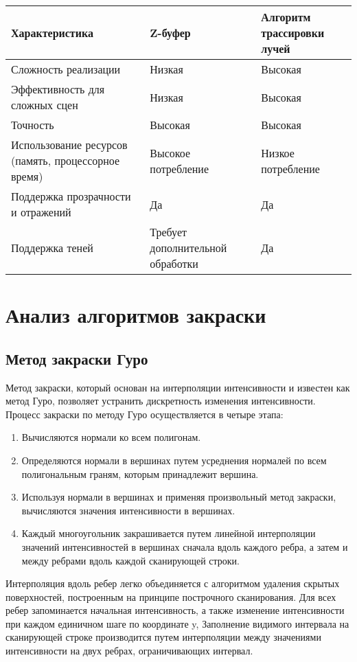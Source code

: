 	\begin{tabular}{|p{5cm}|p{5cm}|p{5cm}|}
		\hline
		Характеристика & Z-буфер & Алгоритм трассировки лучей \\
		\hline
		Сложность реализации & Низкая & Высокая \\
		\hline
		Эффективность для сложных сцен & Низкая & Высокая \\
		\hline
		Точность & Высокая & Высокая \\
		\hline
		Использование ресурсов (память, процессорное время) & Высокое потребление & Низкое потребление \\
		\hline
		Поддержка прозрачности и отражений & Да & Да \\
		\hline
		Поддержка теней & Требует дополнительной обработки & Да \\
		\hline
	\end{tabular}
\section{Анализ алгоритмов закраски}
	\subsection{Метод закраски Гуро}
	Метод закраски, который основан на интерполяции интенсивности и известен как метод Гуро, позволяет устранить дискретность изменения интенсивности. Процесс закраски по методу Гуро осуществляется в четыре этапа:
	\begin{enumerate}
	\item Вычисляются нормали ко всем полигонам.
	\item Определяются нормали в вершинах путем усреднения нормалей по всем полигональным граням, которым принадлежит вершина.
	
		
	\item Используя нормали в вершинах и применяя произвольный метод закраски, вычисляются значения интенсивности в вершинах.
	\item Каждый многоугольник закрашивается путем линейной интерполяции значений интенсивностей в вершинах сначала вдоль каждого ребра, а затем и между ребрами вдоль каждой сканирующей строки.
	
	
	\end{enumerate}
	Интерполяция вдоль ребер легко объединяется с алгоритмом удаления скрытых поверхностей, построенным на принципе построчного сканирования. Для всех ребер запоминается начальная интенсивность, а также изменение интенсивности при каждом единичном шаге по координате y, Заполнение видимого интервала на сканирующей строке производится путем интерполяции между значениями интенсивности на двух ребрах, ограничивающих интервал.
	
